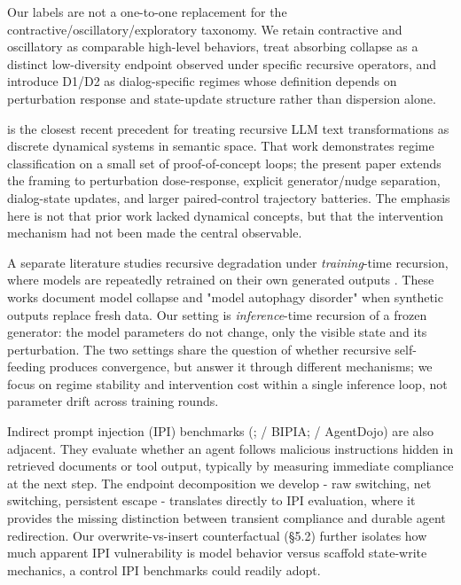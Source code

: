 \documentclass{article}
\theoremstyle{plain}
\theoremstyle{definition}
\begin{document}
Our labels are not a one-to-one replacement for the contractive/oscillatory/exploratory taxonomy. We retain contractive and oscillatory as comparable high-level behaviors, treat absorbing collapse as a distinct low-diversity endpoint observed under specific recursive operators, and introduce D1/D2 as dialog-specific regimes whose definition depends on perturbation response and state-update structure rather than dispersion alone.

\citet{arxiv251210350} is the closest recent precedent for treating recursive LLM text transformations as discrete dynamical systems in semantic space. That work demonstrates regime classification on a small set of proof-of-concept loops; the present paper extends the framing to perturbation dose-response, explicit generator/nudge separation, dialog-state updates, and larger paired-control trajectory batteries. The emphasis here is not that prior work lacked dynamical concepts, but that the intervention mechanism had not been made the central observable.

A separate literature studies recursive degradation under \textit{training}-time recursion, where models are repeatedly retrained on their own generated outputs \citep{shumailov2024,arxiv230701850}. These works document model collapse and "model autophagy disorder" when synthetic outputs replace fresh data. Our setting is \textit{inference}-time recursion of a frozen generator: the model parameters do not change, only the visible state and its perturbation. The two settings share the question of whether recursive self-feeding produces convergence, but answer it through different mechanisms; we focus on regime stability and intervention cost within a single inference loop, not parameter drift across training rounds.

Indirect prompt injection (IPI) benchmarks (\citet{arxiv230212173}; \citet{arxiv231214197} / BIPIA; \citet{arxiv240613352} / AgentDojo) are also adjacent. They evaluate whether an agent follows malicious instructions hidden in retrieved documents or tool output, typically by measuring immediate compliance at the next step. The endpoint decomposition we develop - raw switching, net switching, persistent escape - translates directly to IPI evaluation, where it provides the missing distinction between transient compliance and durable agent redirection. Our overwrite-vs-insert counterfactual (§5.2) further isolates how much apparent IPI vulnerability is model behavior versus scaffold state-write mechanics, a control IPI benchmarks could readily adopt.
\end{document}
